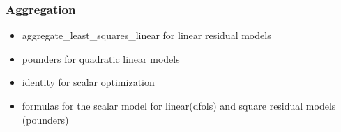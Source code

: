 \subsubsection{Aggregation}
\label{subsubsec:aggregation}
\begin{itemize}
    \item aggregate\_least\_squares\_linear for linear residual models
    \item pounders for quadratic linear models
    \item identity for scalar optimization
    \item formulas for the scalar model for linear(dfols) and square residual models (pounders)
\end{itemize}

